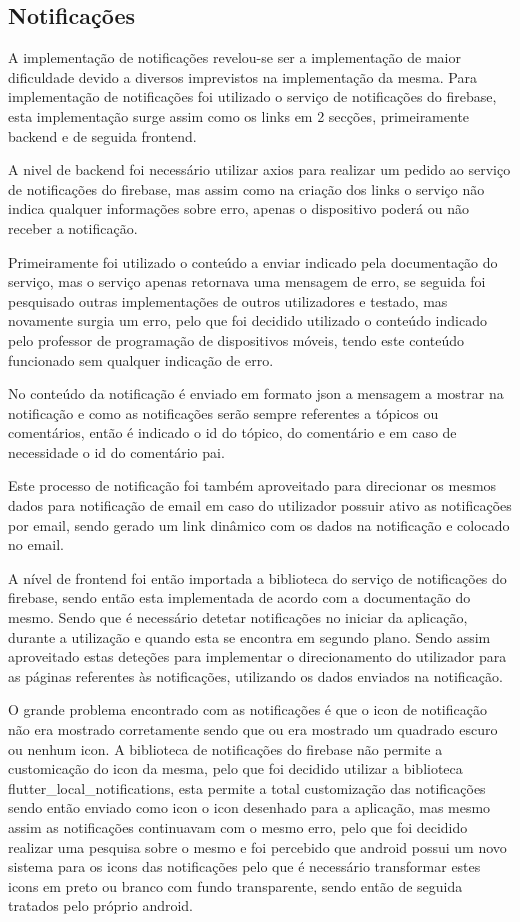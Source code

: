\subsection{Notificações}

A implementação de notificações revelou-se ser a implementação de maior dificuldade devido a diversos imprevistos na implementação da mesma. Para implementação de notificações foi utilizado o serviço de notificações do firebase, esta implementação surge assim como os links em 2 secções, primeiramente backend e de seguida frontend.

A nivel de backend foi necessário utilizar axios para realizar um pedido ao serviço de notificações do firebase, mas assim como na criação dos links o serviço não indica qualquer informações sobre erro, apenas o dispositivo poderá ou não receber a notificação. 

Primeiramente foi utilizado o conteúdo a enviar indicado pela documentação do serviço, mas o serviço apenas retornava uma mensagem de erro, se seguida foi pesquisado outras implementações de outros utilizadores e testado, mas novamente surgia um erro, pelo que foi decidido utilizado o conteúdo indicado pelo professor de programação de dispositivos móveis, tendo este conteúdo funcionado sem qualquer indicação de erro. 

No conteúdo da notificação é enviado em formato json a mensagem a mostrar na notificação e como as notificações serão sempre referentes a tópicos ou comentários, então é indicado o id do tópico, do comentário e em caso de necessidade o id do comentário pai.

Este processo de notificação foi também aproveitado para direcionar os mesmos dados para notificação de email em caso do utilizador possuir ativo as notificações por email, sendo gerado um link dinâmico com os dados na notificação e colocado no email.

A nível de frontend foi então importada a biblioteca do serviço de notificações do firebase, sendo então esta implementada de acordo com a documentação do mesmo. Sendo que é necessário detetar notificações no iniciar da aplicação, durante a utilização e quando esta se encontra em segundo plano. Sendo assim aproveitado estas deteções para implementar o direcionamento do utilizador para as páginas referentes às notificações, utilizando os dados enviados na notificação.

O grande problema encontrado com as notificações é que o icon de notificação não era mostrado corretamente sendo que ou era mostrado um quadrado escuro ou nenhum icon. A biblioteca de notificações do firebase não permite a customicação do icon da mesma, pelo que foi decidido utilizar a biblioteca flutter\_local\_notifications, esta permite a total customização das notificações sendo então enviado como icon o icon desenhado para a aplicação, mas mesmo assim as notificações continuavam com o mesmo erro, pelo que foi decidido realizar uma pesquisa sobre o mesmo e foi percebido que android possui um novo sistema para os icons das notificações pelo que é necessário transformar estes icons em preto ou branco com fundo transparente, sendo então de seguida tratados pelo próprio android.


